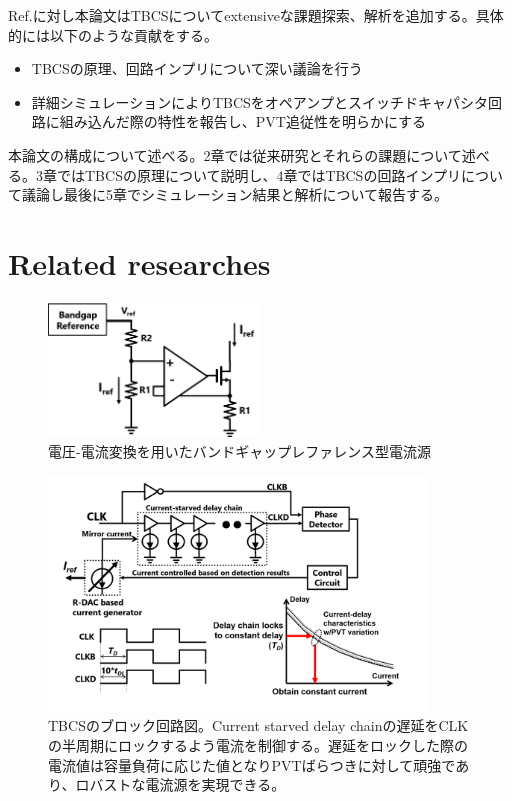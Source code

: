\documentclass[letterpaper, 10 pt, conference]{ieeeconf}  %
\begin{document}
Ref.\cite{yoshioka201728, yoshioka2019digital}に対し本論文はTBCSについてextensiveな課題探索、解析を追加する。具体的には以下のような貢献をする。
\begin{itemize}
\item TBCSの原理、回路インプリについて深い議論を行う
\item 詳細シミュレーションによりTBCSをオペアンプとスイッチドキャパシタ回路に組み込んだ際の特性を報告し、PVT追従性を明らかにする
\end{itemize}
本論文の構成について述べる。2章では従来研究とそれらの課題について述べる。3章ではTBCSの原理について説明し、4章ではTBCSの回路インプリについて議論し最後に5章でシミュレーション結果と解析について報告する。

\section{Related researches}
\begin{figure}[!]
\centering
 \includegraphics[width=0.5\textwidth]{figs/fig1.png}
  \caption{電圧-電流変換を用いたバンドギャップレファレンス型電流源}
\label{bandgap}
\end{figure}

\begin{figure}[!]
\centering
 \includegraphics[width=0.9\textwidth]{figs/fig2.png}
  \caption{TBCSのブロック回路図。Current starved delay chainの遅延をCLKの半周期にロックするよう電流を制御する。遅延をロックした際の電流値は容量負荷に応じた値となりPVTばらつきに対して頑強であり、ロバストな電流源を実現できる。}
  \label{fig2}
\end{figure}
\end{document}
